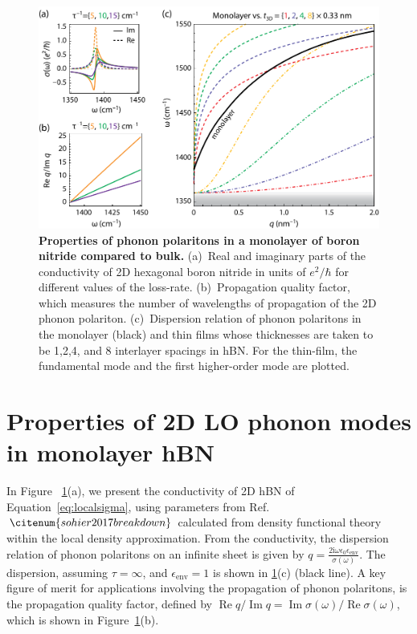 \documentclass[aps,prb,twocolumn,
	           groupedaddress,superscriptaddress,
               amsfonts,amssymb,amsmath,floatfix,
	           citeautoscript]{revtex4-1}
\renewcommand{\Im}{\operatorname{Im}}
\renewcommand{\Re}{\operatorname{Re}}
\newcommand{\iu}{\mathrm{i}}
\begin{document}
\begin{figure}[t]
    \includegraphics[width=.7\linewidth]{figure2hBN.pdf}
    \caption{%
        \textbf{Properties of phonon polaritons in a monolayer of boron nitride compared to bulk.} (a)~Real and imaginary parts of the conductivity of 2D hexagonal boron nitride in units of $e^2/\hbar$ for different values of the loss-rate. (b)~Propagation quality factor, which measures the number of wavelengths of propagation of the 2D phonon polariton. (c)~Dispersion relation of phonon polaritons in the monolayer (black) and thin films whose thicknesses are taken to be 1,2,4, and 8 interlayer spacings in hBN. For the thin-film, the fundamental mode and the first higher-order mode are plotted. 
        \label{fig:2}
        }
\end{figure}

\section{Properties of 2D LO phonon modes in monolayer hBN}

In Figure ~\ref{fig:2}(a), we present the conductivity of 2D hBN of Equation~\ref{eq:localsigma}, using parameters from Ref.~$\citenum{sohier2017breakdown}$ calculated from density functional theory within the local density approximation. From the conductivity, the dispersion relation of phonon polaritons on an infinite sheet is given by $q=\frac{2\iu\omega\epsilon_0\epsilon_{\mathrm{env}}}{\sigma(\omega)}$. The dispersion, assuming $\tau = \infty$, and $\epsilon_{\mathrm{env}}=1$ is shown in \ref{fig:2}(c) (black line). A key figure of merit for applications involving the propagation of phonon polaritons, is the propagation quality factor, defined by ${\Re q}/{\Im q} = {\Im\sigma(\omega)}/{\Re\sigma(\omega)}$, which is shown in Figure~\ref{fig:2}(b).
\end{document}

